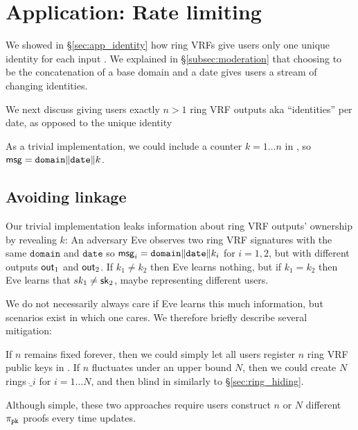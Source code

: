 \section{Application: Rate limiting}
\label{sec:app_rate_limits}

We showed in \S\ref{sec:app_identity} how ring VRFs give users only
one unique identity for each input \msg.  
We explained in \S\ref{subsec:moderation} that choosing \msg to be
the concatenation of a base domain and a date gives users a stream of changing identities.

We next discuss giving users exactly $n > 1$ ring VRF outputs aka
``identities'' per date, as opposed to the unique identity 



As a trivial implementation, we could include a counter $k = 1 \ldots n$
in \msg, so $\mathsf{msg} = \mathtt{domain} \| \mathtt{date} \| k$.


\subsection{Avoiding linkage}

Our trivial implementation leaks information about ring VRF outputs'
 ownership by revealing $k$:
%
An adversary Eve observes two ring VRF signatures with the same
$\mathtt{domain}$ and $\mathtt{date}$ so
$\mathsf{msg}_i = \mathtt{domain} \| \mathtt{date} \| k_i$
for $i=1,2$, but with different outputs ${\mathsf{out}}_1$ and ${\mathsf{out}}_2$.
If $k_1 \ne k_2$ then Eve learns nothing, but if $k_1 = k_2$ then
 Eve learns that $sk_1 \ne \mathsf{sk}_2$, maybe representing different users. 

We do not necessarily always care if Eve learns this much information,
but scenarios exist in which one cares.  We therefore briefly describe
several mitigation:

If $n$ remains fixed forever, then we could simply let all users
register $n$ ring VRF public keys in \ring.
If $n$ fluctuates under an upper bound $N$, then we could create $N$
rings $\ring_i$ for $i = 1 \ldots N$, and
 then blind \comring in \pifast similarly to \S\ref{sec:ring_hiding}.

Although simple, these two approaches require users construct $n$ or $N$
different $\pi_{\mathtt{pk}}$ proofs every time \ring updates.

